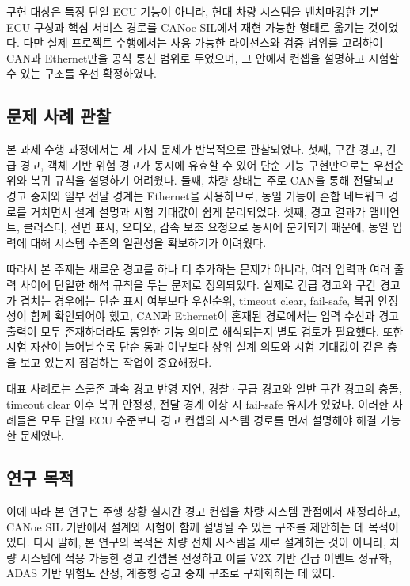 \documentclass[11pt,a4paper]{article}
\begin{document}
구현 대상은 특정 단일 ECU 기능이 아니라, 현대 차량 시스템을 벤치마킹한 기본 ECU 구성과 핵심 서비스 경로를 CANoe SIL에서 재현 가능한 형태로 옮기는 것이었다. 다만 실제 프로젝트 수행에서는 사용 가능한 라이선스와 검증 범위를 고려하여 CAN과 Ethernet만을 공식 통신 범위로 두었으며, 그 안에서 컨셉을 설명하고 시험할 수 있는 구조를 우선 확정하였다.

\subsection{문제 사례 관찰}

본 과제 수행 과정에서는 세 가지 문제가 반복적으로 관찰되었다. 첫째, 구간 경고, 긴급 경고, 객체 기반 위험 경고가 동시에 유효할 수 있어 단순 기능 구현만으로는 우선순위와 복귀 규칙을 설명하기 어려웠다. 둘째, 차량 상태는 주로 CAN을 통해 전달되고 경고 중재와 일부 전달 경계는 Ethernet을 사용하므로, 동일 기능이 혼합 네트워크 경로를 거치면서 설계 설명과 시험 기대값이 쉽게 분리되었다. 셋째, 경고 결과가 앰비언트, 클러스터, 전면 표시, 오디오, 감속 보조 요청으로 동시에 분기되기 때문에, 동일 입력에 대해 시스템 수준의 일관성을 확보하기가 어려웠다.

따라서 본 주제는 새로운 경고를 하나 더 추가하는 문제가 아니라, 여러 입력과 여러 출력 사이에 단일한 해석 규칙을 두는 문제로 정의되었다. 실제로 긴급 경고와 구간 경고가 겹치는 경우에는 단순 표시 여부보다 우선순위, timeout clear, fail-safe, 복귀 안정성이 함께 확인되어야 했고, CAN과 Ethernet이 혼재된 경로에서는 입력 수신과 경고 출력이 모두 존재하더라도 동일한 기능 의미로 해석되는지 별도 검토가 필요했다. 또한 시험 자산이 늘어날수록 단순 통과 여부보다 상위 설계 의도와 시험 기대값이 같은 층을 보고 있는지 점검하는 작업이 중요해졌다.

대표 사례로는 스쿨존 과속 경고 반영 지연, 경찰·구급 경고와 일반 구간 경고의 충돌, timeout clear 이후 복귀 안정성, 전달 경계 이상 시 fail-safe 유지가 있었다. 이러한 사례들은 모두 단일 ECU 수준보다 경고 컨셉의 시스템 경로를 먼저 설명해야 해결 가능한 문제였다.

\subsection{연구 목적}

이에 따라 본 연구는 주행 상황 실시간 경고 컨셉을 차량 시스템 관점에서 재정리하고, CANoe SIL 기반에서 설계와 시험이 함께 설명될 수 있는 구조를 제안하는 데 목적이 있다. 다시 말해, 본 연구의 목적은 차량 전체 시스템을 새로 설계하는 것이 아니라, 차량 시스템에 적용 가능한 경고 컨셉을 선정하고 이를 V2X 기반 긴급 이벤트 정규화, ADAS 기반 위험도 산정, 계층형 경고 중재 구조로 구체화하는 데 있다.
\end{document}
